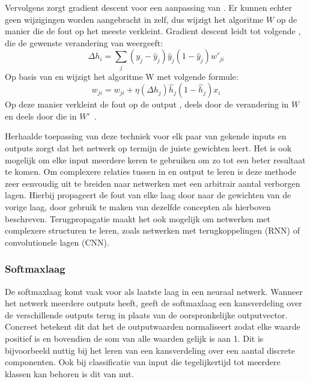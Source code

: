 Vervolgens zorgt gradient descent voor een aanpassing van . Er kunnen echter geen wijzigingen worden aangebracht in  zelf, dus wijzigt het algoritme ${W}$ op de manier die de fout op  het meeste verkleint. Gradient descent leidt tot volgende , die de gewenste verandering van  weergeeft:
\begin{equation}
    \Delta h_i = \sum\limits_{j}(y_j-\hat{y}_j)\hat{y}_j(1-\hat{y}_j)w'_{ji}
\end{equation}
Op basis van  en  wijzigt het algoritme {W} met volgende formule:
\begin{equation}
    w_{ji} = w_{ji} + \eta(\Delta h_j)\hat{h}_j(1-\hat{h}_j)x_i
\end{equation}
Op deze manier verkleint de fout op de output , deels door de verandering in ${W}$ en deels door die in ${W'}$~\cite{Blockeel}.

Herhaalde toepassing van deze techniek voor elk paar van gekende inputs en outputs zorgt dat het netwerk op termijn de juiste gewichten leert. Het is ook mogelijk om elke input meerdere keren te gebruiken om zo tot een beter resultaat te komen. Om complexere relaties tussen in en output te leren is deze methode zeer eenvoudig uit te breiden naar netwerken met een arbitrair aantal verborgen lagen. Hierbij propageert de fout van elke laag door naar de gewichten van de vorige laag, door gebruik te maken van dezelfde concepten als hierboven beschreven. Terugpropagatie maakt het ook mogelijk om netwerken met complexere structuren te leren, zoals netwerken met terugkoppelingen (RNN) of convolutionele lagen (CNN).

\subsubsection{Softmaxlaag}\label{par:softmax}
De softmaxlaag komt vaak voor als laatste laag in een neuraal netwerk. Wanneer het netwerk meerdere outputs heeft, geeft de softmaxlaag een kansverdeling over de verschillende outputs terug in plaats van de oorspronkelijke outputvector. Concreet betekent dit dat het de outputwaarden normaliseert zodat elke waarde positief is en bovendien de som van alle waarden gelijk is aan 1. Dit is bijvoorbeeld nuttig bij het leren van een kansverdeling over een aantal discrete componenten. Ook bij classificatie van input die tegelijkertijd tot meerdere klassen kan behoren is dit van nut.

